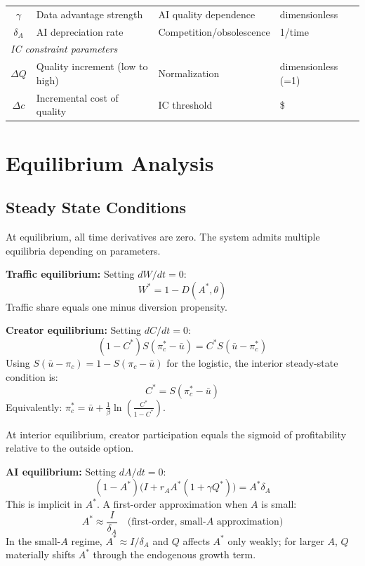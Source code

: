 \documentclass[11pt,a4paper]{article}
\begin{document}
\begin{center}
\begin{tabular}{clll}
$\gamma$ & Data advantage strength & AI quality dependence & dimensionless \\
$\delta_A$ & AI depreciation rate & Competition/obsolescence & 1/time \\
\midrule
\multicolumn{4}{l}{\textit{IC constraint parameters}} \\
$\Delta Q$ & Quality increment (low to high) & Normalization & dimensionless (=1) \\
$\Delta c$ & Incremental cost of quality & IC threshold & \$ \\
\bottomrule
\end{tabular}
\end{center}

\section{Equilibrium Analysis}

\subsection{Steady State Conditions}

At equilibrium, all time derivatives are zero. The system admits multiple equilibria depending on parameters.

\textbf{Traffic equilibrium:} Setting $dW/dt = 0$:
\begin{equation}
W^* = 1 - D(A^*, \theta)
\end{equation}
Traffic share equals one minus diversion propensity.

\textbf{Creator equilibrium:} Setting $dC/dt = 0$:
\begin{equation}
(1-C^*)S(\pi_c^* - \bar{u}) = C^* S(\bar{u} - \pi_c^*)
\end{equation}
Using $S(\bar{u} - \pi_c) = 1 - S(\pi_c - \bar{u})$ for the logistic, the interior steady-state condition is:
\begin{equation}
C^* = S(\pi_c^* - \bar{u})
\end{equation}
Equivalently: $\pi_c^* = \bar{u} + \frac{1}{\beta}\ln\left(\frac{C^*}{1-C^*}\right)$.

At interior equilibrium, creator participation equals the sigmoid of profitability relative to the outside option.

\textbf{AI equilibrium:} Setting $dA/dt = 0$:
\begin{equation}
(1-A^*)\big(I + r_A A^* (1 + \gamma Q^*)\big) = A^* \delta_A
\end{equation}
This is implicit in $A^*$. A first-order approximation when $A$ is small:
\begin{equation}
A^* \approx \frac{I}{\delta_A} \quad \text{(first-order, small-}A\text{ approximation)}
\end{equation}
In the small-$A$ regime, $A^* \approx I/\delta_A$ and $Q$ affects $A^*$ only weakly; for larger $A$, $Q$ materially shifts $A^*$ through the endogenous growth term.
\end{document}
